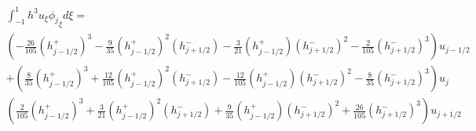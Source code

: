\documentclass[12pt]{article}
\begin{document}
\begin{multline*}
\int_{-1}^{1}h^3u_{\xi}{\phi_{j}}_\xi d\xi  = \\ \left(-\frac{26}{105}\left(h^+_{j - 1/2} \right)^3  -\frac{9}{35} \left(h^+_{j - 1/2} \right)^2\left(h^-_{j + 1/2}\right) -\frac{3}{21} \left(h^+_{j - 1/2} \right)\left(h^-_{j + 1/2}\right)^2 -\frac{2}{105} \left(h^-_{j + 1/2}\right)^3\right)u_{j- 1/2}\\
+ \left( \frac{8}{35}\left(h^+_{j - 1/2} \right)^3 + \frac{12}{105} \left(h^+_{j - 1/2} \right)^2\left(h^-_{j + 1/2}\right) - \frac{12}{105} \left(h^+_{j - 1/2} \right)\left(h^-_{j + 1/2}\right)^2  - \frac{8}{35}\left(h^-_{j + 1/2}\right)^3\right)u_{j}\\
\left(\frac{2}{105}\left(h^+_{j - 1/2} \right)^3 + \frac{3}{21} \left(h^+_{j - 1/2} \right)^2\left(h^-_{j + 1/2}\right) + \frac{9}{35} \left(h^+_{j - 1/2} \right)\left(h^-_{j + 1/2}\right)^2 +  \frac{26}{105}\left(h^-_{j + 1/2}\right)^3\right)u_{j+ 1/2}
\end{multline*}
\end{document}
